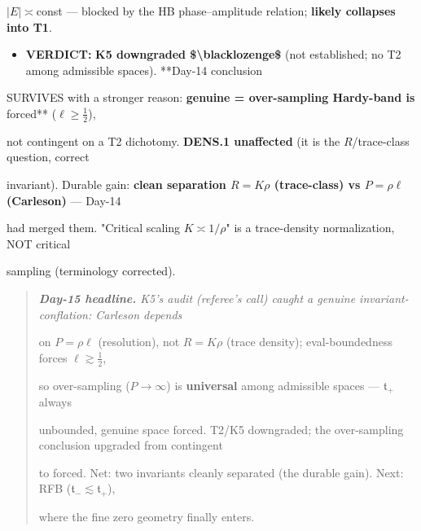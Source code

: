 \documentclass[10pt]{article}
\begin{document}
  $|E|\asymp$const --- blocked by the HB phase--amplitude relation; \textbf{likely collapses into T1}.\par
\begin{itemize}
\item \textbf{VERDICT:} \textbf{K5 downgraded \$\textbackslash{}blacklozenge\$} (not established; no T2 among admissible spaces). **Day-14 conclusion
\end{itemize}
  SURVIVES with a stronger reason:\textbf{ genuine = over-sampling Hardy-band is }forced** ($\ell\ge\tfrac12$),\par
  not contingent on a T2 dichotomy. \textbf{DENS.1 unaffected} (it is the $R$/trace-class question, correct\par
  invariant). Durable gain: \textbf{clean separation $R=K\rho$ (trace-class) vs $P=\rho\ell$ (Carleson)} --- Day-14\par
  had merged them. "Critical scaling $K\asymp1/\rho$" is a trace-density normalization, NOT critical\par
  sampling (terminology corrected).\par

\begin{quote}\itshape
\textbf{Day-15 headline.} K5's audit (referee's call) caught a genuine invariant-conflation: Carleson depends\par
on $P=\rho\ell$ (resolution), not $R=K\rho$ (trace density); eval-boundedness forces $\ell\gtrsim\tfrac12$,\par
so over-sampling ($P\to\infty$) is \textbf{universal} among admissible spaces --- $\mathfrak t_+$ always\par
unbounded, genuine space forced. T2/K5 downgraded; the over-sampling conclusion upgraded from contingent\par
to forced. Net: two invariants cleanly separated (the durable gain). Next: RFB ($\mathfrak t_-\lesssim\mathfrak t_+$),\par
where the fine zero geometry finally enters.\par
\end{quote}
\end{document}
